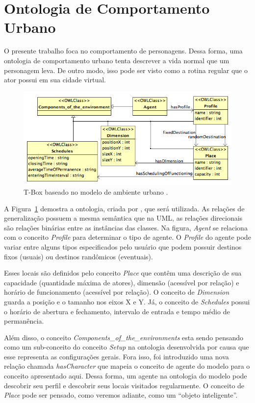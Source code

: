 \section{Ontologia de Comportamento Urbano} \label{ch:aec:ocu}

O presente trabalho foca no comportamento de personagens. Dessa forma, uma
ontologia de comportamento urbano tenta descrever a vida normal que um
personagem leva. De outro modo, isso pode ser visto como a rotina regular que
o ator possui em sua cidade virtual.

\begin{figure}
  \centering
    \includegraphics[width=150mm]{figuras/uem-tbox.png}
  \caption[T-Box baseado no modelo de ambiente urbano.]{T-Box baseado no modelo de ambiente urbano \cite{paiva2005ontology}.}
  \label{fig:UEM:TBOX}
\end{figure}

A Figura~\ref{fig:UEM:TBOX} demostra a ontologia, criada por
\citet{paiva2005ontology}, que será utilizada. As relações de generalização
possuem a mesma semântica que na UML, as relações direcionais são relações
binárias entre as instâncias das classes. Na figura, \emph{Agent} se relaciona
com o conceito \emph{Profile} para determinar o tipo de agente. O
\emph{Profile} do agente pode variar entre alguns tipos especificados pelo
usuário que podem possuir destinos fixos (usuais) ou destinos randômicos
(eventuais).

Esses locais são definidos pelo conceito \emph{Place} que contêm
uma descrição de sua capacidade (quantidade máxima de atores), dimensão
(acessível por relação) e horário de funcionamento (acessível por relação). O
conceito de \emph{Dimension} guarda a posição e o tamanho nos eixos X e Y. Já,
o conceito de \emph{Schedules} possui o horário de abertura e fechamento,
intervalo de entrada e tempo médio de permanência.

Além disso, o conceito \emph{Components\_of\_the\_environments} esta sendo
pensando como um sub-conceito do conceito \emph{Setup} na ontologia
desenvolvida por causa que esse representa as configurações gerais.
%
Fora isso, foi introduzido uma nova relação chamada \emph{hasCharacter} que
mapeia o conceito de agente do modelo \occ para o conceito apresentado aqui.
Dessa forma, um agente na ontologia do
modelo \occ pode descobrir seu perfil e descobrir seus locais visitados
regularmente. O conceito de \emph{Place} pode ser pensado, como veremos
adiante, como um ``objeto inteligente''.

